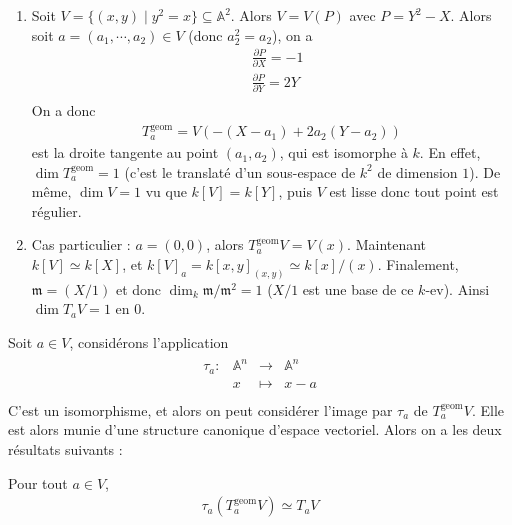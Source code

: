             \begin{expl}
                \begin{enumerate}
                    \item Soit $V = \{(x,y) \mid y^2 = x\} \subseteq \mathbb{A}^2$. Alors $V = V(P)$ avec $P = Y^2 - X$. Alors soit $a = (a_1, \cdots, a_2) \in V$ (donc $a_2^2 = a_2$), on a 
                    \begin{align*}
                        &\frac{\partial P}{\partial X} = -1 \\
                        &\frac{\partial P}{\partial Y} = 2Y \\
                    \end{align*}
                    On a donc 
                    \begin{align*}
                        T_a^\mathrm{geom} = V(-(X - a_1) + 2a_2(Y - a_2))
                    \end{align*}
                    est la droite tangente au point $(a_1, a_2)$, qui est isomorphe à $k$. En effet, $\dim T_a^\mathrm{geom} = 1$ (c'est le translaté d'un sous-espace de $k^2$ de dimension $1$). De même, $\dim V = 1$ vu que $k[V] = k[Y]$, puis $V$ est lisse donc tout point est régulier.
                    \item Cas particulier : $a = (0,0)$, alors $T_a^\mathrm{geom} V = V(x)$. Maintenant $k[V] \simeq k[X]$, et $k[V]_a = k[x,y]_{(x,y)} \simeq k[x]/(x)$. Finalement, $\mathfrak{m} = (X/1)$ et donc $\dim_k \mathfrak{m}/\mathfrak{m}^2 = 1$ ($X/1$ est une base de ce $k$-ev). Ainsi $\dim T_aV = 1$ en $0$.
                \end{enumerate}
            \end{expl}
            Soit $a \in V$, considérons l'application
            \begin{align*}
                \begin{array}{cccc}
                    \tau_a : & \mathbb{A}^n & \to & \mathbb{A}^n \\
                    & x & \mapsto & x - a \\
                \end{array}
            \end{align*}
            C'est un isomorphisme, et alors on peut considérer l'image par $\tau_a$ de $T_a^\mathrm{geom}V$. Elle est alors munie d'une structure canonique d'espace vectoriel. Alors on a les deux résultats suivants :
            \begin{theo}
                \label{theo353}
                Pour tout $a \in V$,
                \begin{align*}
                    \tau_a(T_a^\mathrm{geom}V) \simeq T_aV
                \end{align*}
            \end{theo}
